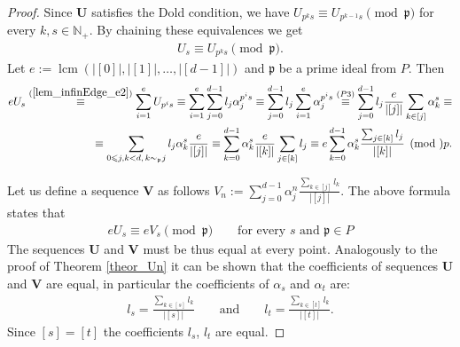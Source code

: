 \documentclass[preprint,12pt]{elsarticle}
\newcommand{\N}{\mathbb{N}}
\newcommand{\pp}{\mathfrak{p} }
\DeclareMathOperator{\lcm}{lcm}
\begin{document}
\begin{proof}
    Since $\textbf{U}$ satisfies the Dold condition, we have $U_{p^ks} \equiv U_{p^{k-1}s} \pmod \pp$ for every $k, s\in\N_+$. By chaining these equivalences we get 
    \begin{align}\label{lem_infinEdge_e2}
        U_{s} \equiv U_{p^{k}s} \pmod \pp .
    \end{align}
    Let $e:=\lcm\left(|[0]|, |[1]|, \ldots,  |[d-1]|\right)$ and $\pp$ be a prime ideal from $P$. Then
    \begin{equation}
        \begin{split}
        eU_s \overset{(\ref{lem_infinEdge_e2})}{\equiv}
        \sum_{i=1}^{e}U_{p^is} \equiv
        \sum_{i=1}^{e}  \sum_{j=0}^{d-1} l_j\alpha_{j}^{p^is} \equiv
        \sum_{j=0}^{d-1} l_j\sum_{i=1}^{e}  \alpha_{j}^{p^is} \overset{(P3)}{\equiv}
        \sum_{j=0}^{d-1} l_j \frac{e}{|[j]|}\sum_{k\in [j]}  \alpha_{k}^{s} \equiv\\
        \equiv \sum_{0\leqslant j,k<d,\, k\sim_\pp j}l_j\alpha_{k}^{s} \frac{e}{|[j]|}\equiv
        \sum_{k=0}^{d-1} \alpha_k^s \frac{e}{|[k]|}\sum_{j\in [k]}  l_j \equiv
        e\sum_{k=0}^{d-1} \alpha_k^s \frac{\sum_{j\in [k]}l_j }{|[k]|}  
        \pmod \pp .
    \end{split}
    \end{equation}


    Let us define a sequence ${\mathbf V}$ as follows $V_n := \sum_{j=0}^{d-1} \alpha_j^n \frac{\sum_{k\in [j]}l_k }{|[j]|}$. The above formula states that 
    \begin{align}
        eU_s \equiv eV_s \pmod \pp \quad\quad \text{for every $s$ and $\pp\in P$}
    \end{align}
    The sequences ${\mathbf U}$ and ${\mathbf V}$ must be thus equal at every point. Analogously to the proof of Theorem \ref{theor_Un} it can be shown that the coefficients of sequences ${\mathbf U}$ and ${\mathbf V}$ are equal, in particular the coefficients of $\alpha_s$ and $\alpha_t$ are:
    \begin{align}
        l_s = \frac{\sum_{k\in [s]}l_k }{|[s]|} \qquad\text{and}\qquad   l_t = \frac{\sum_{k\in [t]}l_k }{|[t]|}.
    \end{align}
    Since $[s]=[t]$ the coefficients $l_s$, $l_t$ are equal.

\end{proof}
\end{document}
